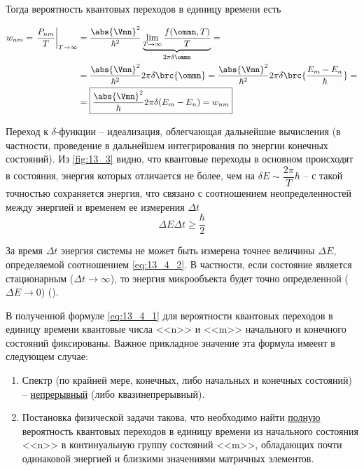 Тогда вероятность квантовых переходов в единицу времени есть

\begin{align}
w_{nm} = \left . \frac{P_{nm}}{T}\right|_{T \to \infty} 
  & = \frac{\abs{\Vmn}^2}{\hbar^2} \underbrace{\lim_{T \to \infty} \frac{f(\ommn, T)}{T}}_{2\pi\delta{\ommn}} = \nonumber \\
  & = \frac{\abs{\Vmn}^2}{\hbar^2} 2 \pi \delta \brc{\ommn}
  = \frac{\abs{\Vmn}^2}{\hbar^2} 2 \pi \delta \brc{\frac{E_m - E_n}{\hbar}} = \nonumber \\
  \label{eq:13_4_1}
  &= \boxed {
    \frac{\abs{\Vmn}^2}{\hbar} 2 \pi \delta (E_m - E_n) = w_{nm}
  }
\end{align}

Переход к $\delta$-функции -- идеализация, облегчающая дальнейшие вычисления (в частности, проведение в дальнейшем интегрирования по энергии конечных состояний). Из \autoref{fig:13_3} видно, что квантовые переходы в основном происходят в состояния, энергия которых отличается не более, чем на $\delta E \sim \dfrac{2\pi}{T} \hbar$ -- с такой точностью сохраняется энергия, что связано с соотношением неопределенностей между энергией и временем ее измерения $\Delta t$
\begin{equation}
\label{eq:13_4_2}
\boxed{\Delta E \Delta t \ge \frac{\hbar}{2}} 
\end{equation}

За время $\Delta t$ энергия системы не может быть измерена точнее величины $\Delta E$, определяемой соотношением \eqref{eq:13_4_2}. В частности, если состояние является стационарным ($\Delta t \to \infty$), то энергия микрообъекта будет точно определенной ($\Delta E \to 0$) ().

В полученной формуле \eqref{eq:13_4_1} для вероятности квантовых переходов в единицу времени квантовые числа <<n>> и <<m>> начального и конечного состояний фиксированы. Важное прикладное значение эта формула имеент в следующем случае:
\begin{enumerate}
\item Спектр (по крайней мере, конечных, либо начальных и конечных состояний) -- \underline{непрерывный} (либо квазинепрерывный).
\item Постановка физической задачи такова, что необходимо найти \underline{полную} вероятность квантовых переходов в единицу времени из начального состояния <<n>> в континуальную группу состояний <<m>>, обладающих почти одинаковой энергией и близкими значениями матричных элементов.
\end{enumerate}

